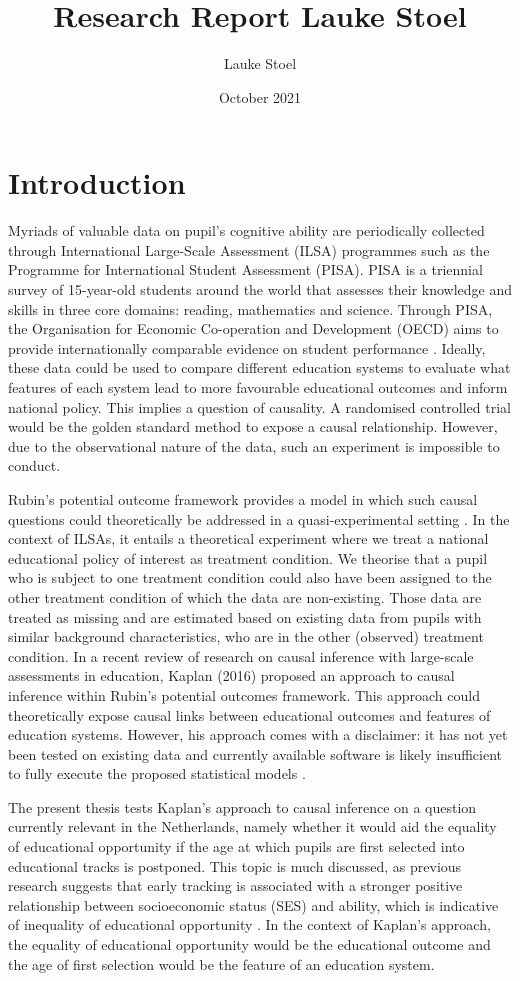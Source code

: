 \documentclass{article}
\title{Research Report Lauke Stoel}
\author{Lauke Stoel }
\date{October 2021}
\begin{document}


\section{Introduction}

Myriads of valuable data on pupil's cognitive ability are periodically collected through International Large-Scale Assessment (ILSA) programmes such as the Programme for International Student Assessment (PISA). PISA is a triennial survey of 15-year-old students around the world that assesses their knowledge and skills in three core domains: reading, mathematics and science. Through PISA, the Organisation for Economic Co-operation and Development (OECD) aims to provide internationally comparable evidence on student performance \parencite{oecd_pisa_2020}. Ideally, these data could be used to compare different education systems to evaluate what features of each system lead to more favourable educational outcomes and inform national policy. This implies a question of causality. A randomised controlled trial would be the golden standard method to expose a causal relationship. However, due to the observational nature of the data, such an experiment is impossible to conduct.

Rubin's potential outcome framework provides a model in which such causal questions could theoretically be addressed in a quasi-experimental setting \parencite{rubin_potential_2004}. In the context of ILSAs, it entails a theoretical experiment where we treat a national educational policy of interest as treatment condition. We theorise that a pupil who is subject to one treatment condition could also have been assigned to the other treatment condition of which the data are non-existing. Those data are treated as missing and are estimated based on existing data from pupils with similar background characteristics, who are in the other (observed) treatment condition. In a recent review of research on causal inference with large-scale assessments in education, Kaplan (2016) proposed an approach to causal inference within Rubin's potential outcomes framework. This approach could theoretically expose causal links between educational outcomes and features of education systems. However, his approach comes with a disclaimer: it has not yet been tested on existing data and currently available software is likely insufficient to fully execute the proposed statistical models \parencite{kaplan_causal_2016}. 

The present thesis tests Kaplan's approach to causal inference on a question currently relevant in the Netherlands, namely whether it would aid the equality of educational opportunity if the age at which pupils are first selected into educational tracks is postponed. This topic is much discussed, as previous research suggests that early tracking is associated with a stronger positive relationship between socioeconomic status (SES) and ability, which is indicative of inequality of educational opportunity \parencite{veldhuis_onderwijscrisis_2021, bol_curricular_2014}. In the context of Kaplan's approach, the equality of educational opportunity would be the educational outcome and the age of first selection would be the feature of an education system.
\end{document}
